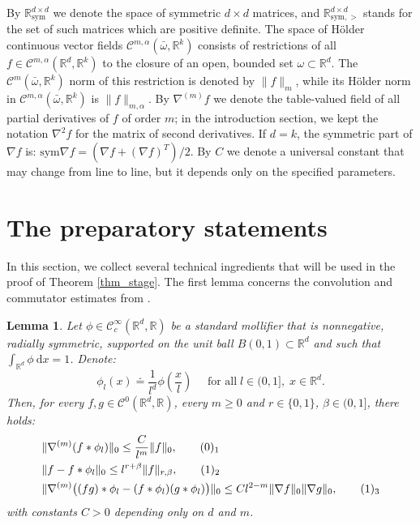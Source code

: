 \documentclass[reqno,twoside,11pt]{amsart}
\newcommand{\dx}{~\mathrm{d}x}
\newcommand{\sym}{\mathrm{sym}}
\newcommand{\R}{\mathbb{R}}
\numberwithin{equation}{section}
\theoremstyle{plain}
\newtheorem{lemma}[theorem]{Lemma}
\theoremstyle{definition}
\begin{document}
\medskip

\noindent By $\mathbb{R}^{d\times d}_{\sym}$ we denote the space of symmetric
$d\times d$ matrices, and $\mathbb{R}^{d\times d}_{\sym, >}$ stands for the set of such matrices which are positive definite. The space of H\"older continuous vector fields
$\mathcal{C}^{m,\alpha}(\bar\omega,\R^k)$ consists of restrictions of
all $f\in \mathcal{C}^{m,\alpha}(\mathbb{R}^d,\R^k)$ to the closure of
an open, bounded set $\omega\subset\R^d$. The
$\mathcal{C}^m(\bar\omega,\R^k)$ norm of this restriction is
denoted by $\|f\|_m$, while its H\"older norm in $\mathcal{C}^{m,
  \alpha}(\bar\omega,\R^k)$ is $\|f\|_{m,\alpha}$. By $\nabla^{(m)}f$
we denote the table-valued field of all partial derivatives of $f$ of order
$m$; in the introduction section, we kept the notation $\nabla^2f$ for the matrix of second derivatives. If $d=k$, the symmetric part of $\nabla f$ is: $\sym\nabla f = (\nabla f + (\nabla f)^T)/2$.
By $C$ we denote a universal constant that may change from line to
line, but it depends only on the specified parameters.

\section{The preparatory statements}\label{sec_step}

In this section, we collect several technical ingredients that will be
used in the proof of Theorem \ref{thm_stage}. 
The first lemma concerns the
convolution and commutator estimates from \cite{CDS}.

\begin{lemma}\label{lem_stima}
Let $\phi\in\mathcal{C}_c^\infty(\R^d,\mathbb{R})$ be a standard
mollifier that is nonnegative, radially symmetric, supported on the
unit ball $B(0,1)\subset\R^d$ and such that $\int_{\mathbb{R}^d} \phi \dx = 1$. Denote: 
$$\phi_l (x) \doteq \frac{1}{l^d}\phi(\frac{x}{l})\quad\mbox{ for all
}\; l\in (0,1], \;  x\in\R^d.$$
Then, for every $f,g\in\mathcal{C}^0(\mathbb{R}^d,\R)$, every
$m\geq 0$ and $r\in\{0,1\}$, $\beta\in (0,1]$, there holds:
\begin{align*}
& \|\nabla^{(m)}(f\ast\phi_l)\|_{0} \leq
\frac{C}{l^m}\|f\|_0,\tag*{(\theequation)$_1$}\vspace{1mm} \refstepcounter{equation} \label{stima1}\\
& \|f - f\ast\phi_l\|_0\leq l^{r
+\beta} \|f\|_{r,\beta},\tag*{(\theequation)$_2$} \vspace{1mm} \label{stima2}\\
& \|\nabla^{(m)}\big((fg)\ast\phi_l - (f\ast\phi_l)
(g\ast\phi_l)\big)\|_0\leq {C}{l^{2- m}}\|\nabla f\|_{0}
\|\nabla g\|_{0}, \tag*{(\theequation)$_3$} \label{stima4}
\end{align*}
with constants $C>0$ depending only on $d$ and $m$. 
\end{lemma}
\end{document}
